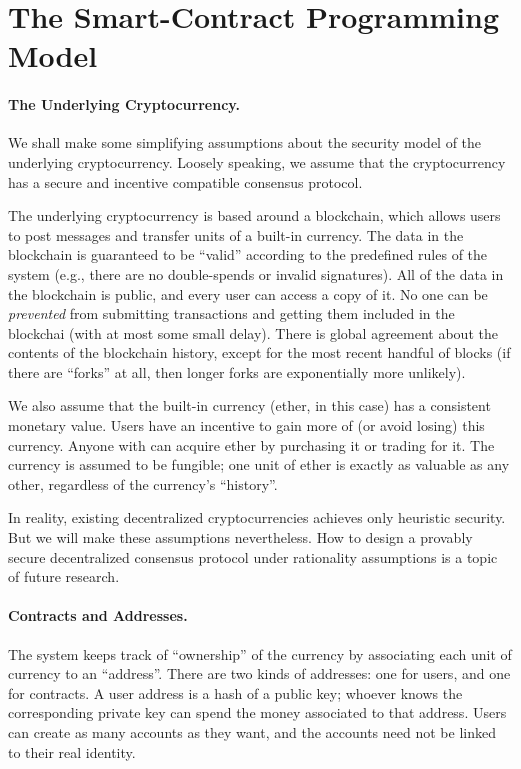 \documentclass[10pt,twocolumn,letterpaper]{article}
\begin{document}

\section{The Smart-Contract Programming Model}

\paragraph{The Underlying Cryptocurrency.}
We shall make some simplifying assumptions 
about the security model of the underlying cryptocurrency.
Loosely speaking, we assume that the
cryptocurrency has a secure and incentive compatible
consensus protocol.

The underlying cryptocurrency is based around a blockchain,
which allows users to post messages and transfer units of a built-in currency.
The data in the blockchain is guaranteed to be ``valid'' according to the predefined rules of the system (e.g., there are no double-spends or invalid signatures).
All of the data in the blockchain is public, and every user can access a copy of it.
No one can be \emph{prevented} from submitting transactions and getting 
them included in the blockchai (with at most some small delay).
There is global agreement about the contents of the blockchain history, except for the most 
recent handful of blocks (if there are ``forks'' at all, then longer forks are exponentially more unlikely).

We also assume that the built-in currency (ether, in this case) has a consistent monetary value. Users have an incentive to gain more of (or avoid losing) this currency. Anyone with can acquire ether by purchasing it or trading for it. The currency is assumed to be fungible; one unit of ether is exactly as valuable as any other, regardless of the currency's ``history''.

In reality, existing decentralized cryptocurrencies
achieves only heuristic security. But we will make these assumptions
nevertheless. How to design a provably  
secure decentralized consensus protocol under
rationality assumptions is a topic of 
future research.

\paragraph{Contracts and Addresses.}
The system keeps track of ``ownership'' of the currency by associating each unit of currency to an ``address''. There are two kinds of addresses: one for users, and one for contracts. A user address is a hash of a public key; whoever knows the corresponding private key can spend the money associated to that address. Users can create as many accounts as they want, and the accounts need not be linked to their real identity.
\end{document}
